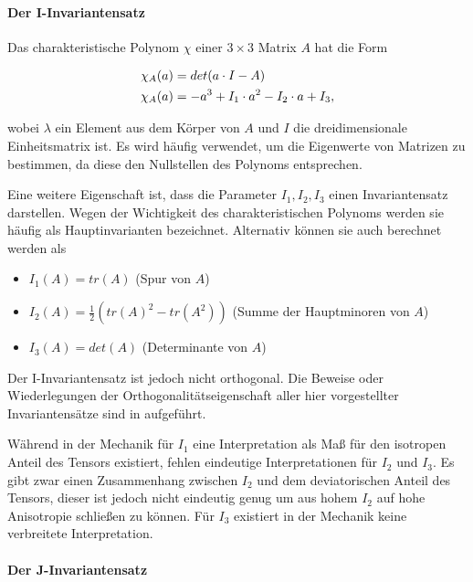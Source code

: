 \documentclass[a4paper,fontsize=12pt,toc=bib,parskip=half,ngerman]{scrartcl}
\begin{document}
\paragraph{Der I-Invariantensatz}
Das charakteristische Polynom $\chi$ einer $3\times3$ Matrix $A$ hat die Form

\begin{equation}
	\centering
	\begin{split}
	&\chi_A(a) = det(a \cdot I - A)\\
	&\chi_A(a) = -a^3 + I_1\cdot a^2 - I_2\cdot a + I_3,
	\end{split}
\end{equation}

wobei $\lambda$ ein Element aus dem K\"orper von $A$ und $I$ die dreidimensionale Einheitsmatrix ist. Es wird h\"aufig verwendet, um die Eigenwerte von Matrizen zu bestimmen, da diese den Nullstellen des Polynoms entsprechen.

Eine weitere Eigenschaft ist, dass die Parameter $I_1, I_2, I_3$ einen Invariantensatz darstellen. Wegen der Wichtigkeit des charakteristischen Polynoms werden sie h\"aufig als \glq Hauptinvarianten\grq{} bezeichnet. Alternativ k\"onnen sie auch berechnet werden als

\begin{itemize}
	\item $I_1(A) = tr(A)$ (Spur von $A$)
	\item $I_2(A) = \frac{1}{2}(tr(A)^2 - tr(A^2))$ (Summe der Hauptminoren von $A$)
	\item $I_3(A) = det(A)$ (Determinante von $A$)
\end{itemize}

Der I-Invariantensatz ist jedoch nicht orthogonal. Die Beweise oder Wiederlegungen der Orthogonalit\"atseigenschaft aller hier vorgestellter Invariantens\"atze sind in \cite[S.~144]{ennis2006orthogonal} aufgef\"uhrt.

W\"ahrend in der Mechanik f\"ur $I_1$ eine Interpretation als Ma{\ss} f\"ur den isotropen Anteil des Tensors existiert, fehlen eindeutige Interpretationen f\"ur $I_2$ und $I_3$. Es gibt zwar einen Zusammenhang zwischen $I_2$ und dem deviatorischen Anteil des Tensors, dieser ist jedoch nicht eindeutig genug um aus hohem $I_2$ auf hohe Anisotropie schlie{\ss}en zu k\"onnen. F\"ur $I_3$ existiert in der Mechanik keine verbreitete Interpretation. 

\paragraph{Der J-Invariantensatz}
\end{document}
